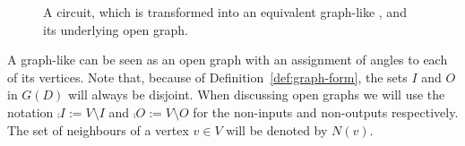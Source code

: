 \documentclass[a4paper,onecolumn,superscriptaddress,11pt,accepted=2020-04-27]{quantumarticle}
\newcommand{\UG}[1]{\ensuremath{G(#1)}\xspace}
\theoremstyle{definition}
\newtheorem{lemma}[theorem]{Lemma}
\newtheorem{definition}[theorem]{Definition}
\newtheorem{example}[theorem]{Example}
\begin{document}
\begin{figure}[!htb]
	\centering
	\caption{A circuit, which is transformed into an equivalent graph-like \zxdiagram, and its underlying open graph.}
    \label{fig:underlying-graph}
\end{figure}




A graph-like \zxdiagram can be seen as an open graph with an assignment of angles to each of its vertices. Note that, because of Definition~\ref{def:graph-form}, the sets $I$ and $O$ in $\UG D$ will always be disjoint. When discussing open graphs we will use the notation $\comp I:=V\setminus I$ and $\comp O:=V\setminus O$ for the non-inputs and non-outputs respectively. The set of neighbours of a vertex $v\in V$ will be denoted by $N(v)$.
\end{document}

